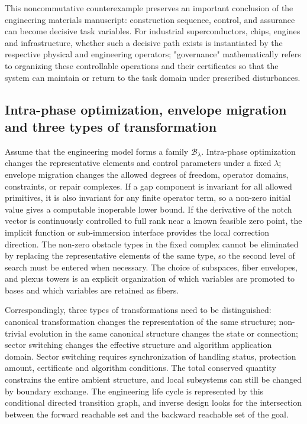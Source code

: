 \documentclass[11pt,a4paper]{article}
\theoremstyle{plain}
\theoremstyle{definition}
\theoremstyle{remark}
\begin{document}
\begin{CJK*}
This noncommutative counterexample preserves an important conclusion of the engineering materials manuscript: construction sequence, control, and assurance can become decisive task variables. For industrial superconductors, chips, engines and infrastructure, whether such a decisive path exists is instantiated by the respective physical and engineering operators; "governance" mathematically refers to organizing these controllable operations and their certificates so that the system can maintain or return to the task domain under prescribed disturbances.

\subsection { Intra-phase optimization, envelope migration and three types of transformation }

Assume that the engineering model forms a family $\mathcal B_\lambda$. Intra-phase optimization changes the representative elements and control parameters under a fixed $\lambda$; envelope migration changes the allowed degrees of freedom, operator domains, constraints, or repair complexes. If a gap component is invariant for all allowed primitives, it is also invariant for any finite operator term, so a non-zero initial value gives a computable inoperable lower bound. If the derivative of the notch vector is continuously controlled to full rank near a known feasible zero point, the implicit function or sub-immersion interface provides the local correction direction. The non-zero obstacle types in the fixed complex cannot be eliminated by replacing the representative elements of the same type, so the second level of search must be entered when necessary. The choice of subspaces, fiber envelopes, and plexus towers is an explicit organization of which variables are promoted to bases and which variables are retained as fibers. \cite{S13,S14}

Correspondingly, three types of transformations need to be distinguished: canonical transformation changes the representation of the same structure; non-trivial evolution in the same canonical structure changes the state or connection; sector switching changes the effective structure and algorithm application domain. Sector switching requires synchronization of handling status, protection amount, certificate and algorithm conditions. The total conserved quantity constrains the entire ambient structure, and local subsystems can still be changed by boundary exchange. The engineering life cycle is represented by this conditional directed transition graph, and inverse design looks for the intersection between the forward reachable set and the backward reachable set of the goal.


\end{CJK*}
\end{document}
